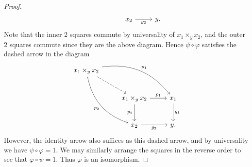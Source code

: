 \begin{proof}
\[\begin{tikzcd}[row sep = 2.5em, column sep = 2.5em]
	 &  & x_2 \ar[" g_2 "', r]  & y.
	\end{tikzcd}\]
	Note that the inner 2 squares commute by universality of $x_1\times_yx_2$, and the outer 2 squares commute since they are the above diagram. Hence $\psi \circ \varphi  $ satisfies the dashed arrow in the diagram
	\[\begin{tikzcd}[row sep = 2.5em, column sep = 2.5em]
	x_1\times _yx_2 \ar[" p_1 ", bend left, drr] \ar[" p_2 "', bend right, ddr] \ar[dashed, dr]  &  &  \\
	 & x_1\times _yx_2 \ar[" p_1 ", r] \ar[" p_2 "', d]  & x_1 \ar[" g_1 ", d]  \\
	 & x_2 \ar[" g_2 "', r]  & y.
	\end{tikzcd}\]
	However, the identity arrow also suffices as this dashed arrow, and by universality we have $\psi \circ \varphi =1$. We may similarly arrange the squares in the reverse order to see that $\varphi \circ \psi  = 1$. Thus $\varphi $ is an isomorphism.
\end{proof}

